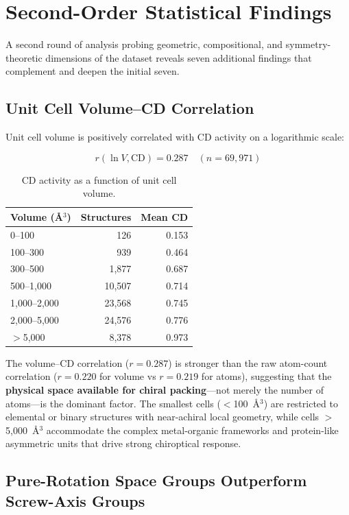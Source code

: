 \documentclass[11pt,a4paper]{article}
\begin{document}
\section{Second-Order Statistical Findings}

A second round of analysis probing geometric, compositional, and symmetry-theoretic dimensions of the dataset reveals seven additional findings that complement and deepen the initial seven.

\subsection{Unit Cell Volume--CD Correlation}

Unit cell volume is positively correlated with CD activity on a logarithmic scale:

\begin{equation}
r(\ln V, \text{CD}) = 0.287 \quad (n = 69{,}971)
\end{equation}

\begin{table}[H]
\centering
\caption{CD activity as a function of unit cell volume.}
\label{tab:vol_cd}
\begin{tabular}{lrr}
\toprule
Volume (\AA$^3$) & Structures & Mean CD \\
\midrule
0--100 & 126 & 0.153 \\
100--300 & 939 & 0.464 \\
300--500 & 1,877 & 0.687 \\
500--1,000 & 10,507 & 0.714 \\
1,000--2,000 & 23,568 & 0.745 \\
2,000--5,000 & 24,576 & 0.776 \\
$>$5,000 & 8,378 & 0.973 \\
\bottomrule
\end{tabular}
\end{table}

\noindent The volume--CD correlation ($r = 0.287$) is stronger than the raw atom-count correlation ($r = 0.220$ for volume vs $r = 0.219$ for atoms), suggesting that the \textbf{physical space available for chiral packing}---not merely the number of atoms---is the dominant factor. The smallest cells ($<$100~\AA$^3$) are restricted to elemental or binary structures with near-achiral local geometry, while cells $>$5,000~\AA$^3$ accommodate the complex metal-organic frameworks and protein-like asymmetric units that drive strong chiroptical response.

\subsection{Pure-Rotation Space Groups Outperform Screw-Axis Groups}
\end{document}
